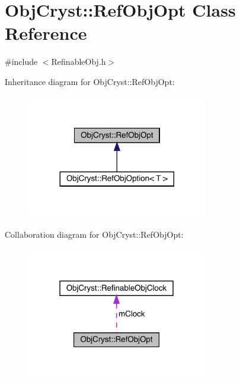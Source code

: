 \hypertarget{class_obj_cryst_1_1_ref_obj_opt}{}\section{Obj\+Cryst\+::Ref\+Obj\+Opt Class Reference}
\label{class_obj_cryst_1_1_ref_obj_opt}


{\ttfamily \#include $<$Refinable\+Obj.\+h$>$}



Inheritance diagram for Obj\+Cryst\+::Ref\+Obj\+Opt\+:
\nopagebreak
\begin{figure}[H]
\begin{center}
\leavevmode
\includegraphics[width=224pt]{class_obj_cryst_1_1_ref_obj_opt__inherit__graph}
\end{center}
\end{figure}


Collaboration diagram for Obj\+Cryst\+::Ref\+Obj\+Opt\+:
\nopagebreak
\begin{figure}[H]
\begin{center}
\leavevmode
\includegraphics[width=223pt]{class_obj_cryst_1_1_ref_obj_opt__coll__graph}
\end{center}
\end{figure}
